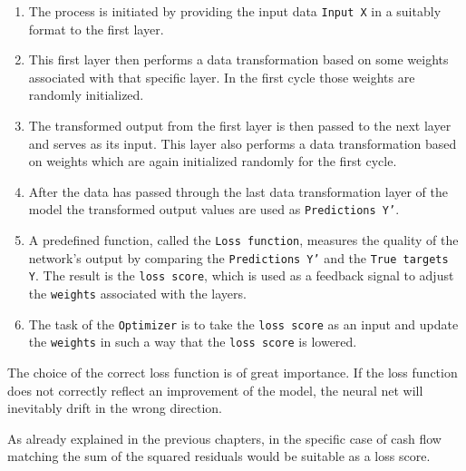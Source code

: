 \begin{enumerate}[label=Step \arabic*:]
	\item The process is initiated by providing the input data \texttt{Input X} in a suitably format to the first layer. 	
	\item This first layer then performs a data transformation based on some weights associated with that specific layer. In the first cycle those weights are randomly initialized.
	\item The transformed output from the first layer is then passed to the next layer and serves as its input. This layer also performs a data transformation based on weights which are again initialized randomly for the first cycle.
	\item After the data has passed through the last data transformation layer of the model the transformed output values are used as \texttt{Predictions Y'}.
	\item A predefined function, called the \texttt{Loss function}, measures the quality of the network’s output by comparing the \texttt{Predictions Y'} and the \texttt{True targets Y}. The result is the \texttt{loss score}, which is used as a feedback signal to adjust the \texttt{weights} associated with the layers.
	\item The task of the \texttt{Optimizer} is to take the \texttt{loss score} as an input and update the \texttt{weights} in such a way that the \texttt{loss score} is lowered.
\end{enumerate}

\begin{remark}
	The choice of the correct loss function is of great importance. If the loss function does not correctly reflect an improvement of the model, the neural net will inevitably drift in the wrong direction.
\end{remark}
\begin{remark}
	As already explained in the previous chapters, in the specific case of cash flow matching the sum of the squared residuals would be suitable as a loss score.
\end{remark}

